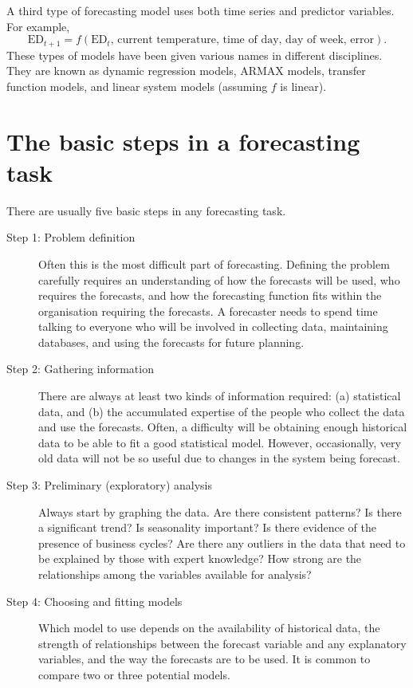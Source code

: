 \documentclass[a4paper,10pt]{article}
\begin{document}
A third type of forecasting model uses both time series and predictor variables. For example,
\begin{equation}
  \text{ED}_{t+1} = f(\text{ED$_t$, current temperature, time of day, day of week, error}).
\end{equation}
These types of models have been given various names in different disciplines. They are known as dynamic regression models, ARMAX models, transfer function models, and linear system models (assuming $f$ is linear).

\section{The basic steps in a forecasting task}

There are usually five basic steps in any forecasting task.
\begin{description}
  \item[Step 1: Problem definition]
    Often this is the most difficult part of forecasting. Defining the problem carefully requires an understanding of how the forecasts will be used, who requires the forecasts, and how the forecasting function fits within the organisation requiring the forecasts. A forecaster needs to spend time talking to everyone who will be involved in collecting data, maintaining databases, and using the forecasts for future planning.

  \item[Step 2: Gathering information]
    There are always at least two kinds of information required: (a) statistical data, and (b) the accumulated expertise of the people who collect the data and use the forecasts. Often, a difficulty will be obtaining enough historical data to be able to fit a good statistical model. However, occasionally, very old data will not be so useful due to changes in the system being forecast.

  \item[Step 3: Preliminary (exploratory) analysis]
    Always start by graphing the data. Are there consistent patterns? Is there a significant trend? Is seasonality important? Is there evidence of the presence of business cycles? Are there any outliers in the data that need to be explained by those with expert knowledge? How strong are the relationships among the variables available for analysis?

  \item[Step 4: Choosing and fitting models]
    Which model to use depends on the availability of historical data, the strength of relationships between the forecast variable and any explanatory variables, and the way the forecasts are to be used. It is common to compare two or three potential models.


\end{description}
\end{document}
